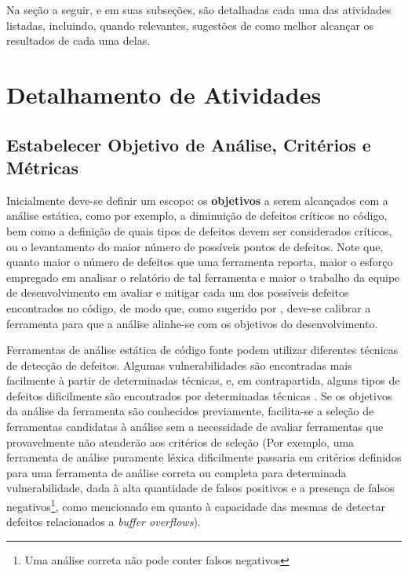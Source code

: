 

Na seção a seguir,  e em suas subseções, são detalhadas cada uma das atividades listadas, incluindo, quando relevantes, sugestões de como melhor alcançar os resultados de cada uma delas.

\section{Detalhamento de Atividades}\label{metodologia_proposta:detalhamento_de_atividades}

\subsection{Estabelecer Objetivo de Análise, Critérios e Métricas}

Inicialmente deve-se definir um escopo: os \textbf{objetivos} a serem alcançados com a análise estática, como por exemplo, a diminuição de defeitos críticos no código, bem como a definição de quais tipos de defeitos devem ser considerados críticos, ou o levantamento do maior número de possíveis pontos de defeitos. Note que, quanto maior o número de defeitos que uma ferramenta reporta, maior o esforço empregado em analisar o relatório de tal ferramenta e maior o trabalho da equipe de desenvolvimento em avaliar e mitigar cada um dos possíveis defeitos encontrados no código, de modo que, como sugerido por \cite{seatbelts}, deve-se calibrar a ferramenta para que a análise alinhe-se com os objetivos do desenvolvimento.

Ferramentas de análise estática de código fonte podem utilizar diferentes técnicas de detecção de defeitos. Algumas vulnerabilidades são encontradas mais facilmente à partir de determinadas técnicas, e, em contrapartida, alguns tipos de defeitos dificilmente são encontrados por determinadas técnicas \cite{harvard}. Se os objetivos da análise da ferramenta são conhecidos previamente, facilita-se a seleção de ferramentas candidatas à análise sem a necessidade de avaliar ferramentas que provavelmente não atenderão aos critérios de seleção (Por exemplo, uma ferramenta de análise puramente léxica dificilmente passaria em critérios definidos para uma ferramenta de análise correta ou completa para determinada vulnerabilidade, dada à alta quantidade de falsos positivos e a presença de falsos negativos\footnote{Uma análise correta não pode conter falsos negativos}, como mencionado em \cite{harvard} quanto à capacidade das mesmas de detectar defeitos relacionados a \textit{buffer overflows}).

